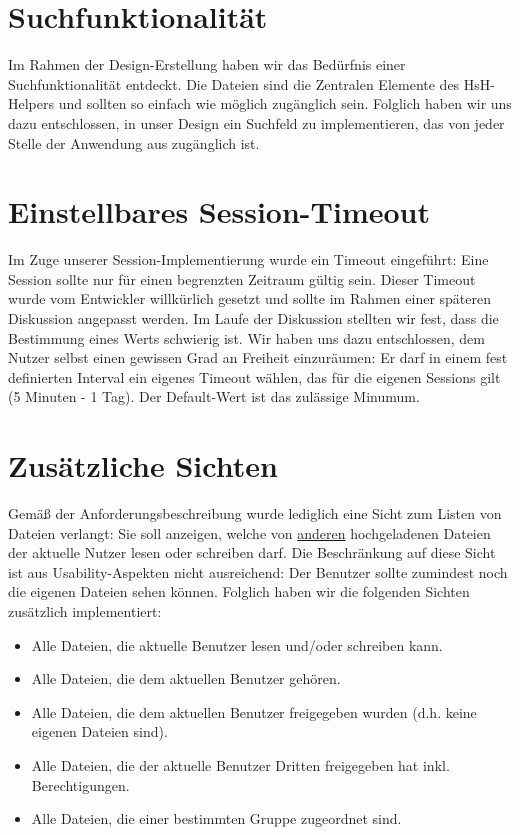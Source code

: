 \documentclass[12pt,DIV14,BCOR10mm,a4paper,parskip=half-,headsepline,headinclude,english,ngerman,bibliography=totocnumbered]{scrreprt}
\begin{document}
\section{Suchfunktionalität}
Im Rahmen der Design-Erstellung haben wir das Bedürfnis einer Suchfunktionalität entdeckt. Die Dateien sind die Zentralen Elemente des HsH-Helpers und sollten so einfach wie möglich zugänglich sein. Folglich haben wir uns dazu entschlossen, in unser Design ein Suchfeld zu implementieren, das von jeder Stelle der Anwendung aus zugänglich ist.

\section{Einstellbares Session-Timeout}
Im Zuge unserer Session-Implementierung wurde ein Timeout eingeführt: Eine Session sollte nur für einen begrenzten Zeitraum gültig sein. Dieser Timeout wurde vom Entwickler willkürlich gesetzt und sollte im Rahmen einer späteren Diskussion angepasst werden. Im Laufe der Diskussion stellten wir fest, dass die Bestimmung eines Werts schwierig ist. Wir haben uns dazu entschlossen, dem Nutzer selbst einen gewissen Grad an Freiheit einzuräumen: Er darf in einem fest definierten Interval ein eigenes Timeout wählen, das für die eigenen Sessions gilt (5 Minuten - 1 Tag). Der Default-Wert ist das zulässige Minumum.

\section{Zusätzliche Sichten}
Gemäß der Anforderungsbeschreibung wurde lediglich eine Sicht zum Listen von Dateien verlangt: Sie soll anzeigen, welche von \underline{anderen} hochgeladenen Dateien der aktuelle Nutzer lesen oder schreiben darf. Die Beschränkung auf diese Sicht ist aus Usability-Aspekten nicht ausreichend: Der Benutzer sollte zumindest noch die eigenen Dateien sehen können. Folglich haben wir die folgenden Sichten zusätzlich implementiert:

\begin{itemize}
	\item Alle Dateien, die aktuelle Benutzer lesen und/oder schreiben kann.
	\item Alle Dateien, die dem aktuellen Benutzer gehören.
	\item Alle Dateien, die dem aktuellen Benutzer freigegeben wurden (d.h. keine eigenen Dateien sind).
	\item Alle Dateien, die der aktuelle Benutzer Dritten freigegeben hat inkl. Berechtigungen.
	\item Alle Dateien, die einer bestimmten Gruppe zugeordnet sind.
\end{itemize}
\end{document}
